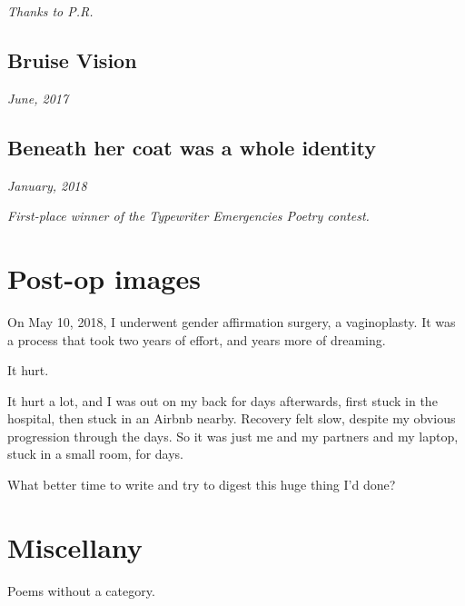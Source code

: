 \documentclass[10pt]{memoir}
\begin{document}
  \textit{Thanks to P.R.}
  \newpage


  \section{Bruise Vision}

  \hfill\textit{June, 2017}

  
  \newpage


  \section{Beneath her coat was a whole identity}

  \hfill\textit{January, 2018}

  

  \textit{First-place winner of the Typewriter Emergencies Poetry contest.}
  \newpage


  \chapter{Post-op images}

  On May 10, 2018, I underwent gender affirmation surgery, a vaginoplasty. It was a process that took two years of effort, and years more of dreaming.

  It hurt.

  It hurt a lot, and I was out on my back for days afterwards, first stuck in the hospital, then stuck in an Airbnb nearby. Recovery felt slow, despite my obvious progression through the days. So it was just me and my partners and my laptop, stuck in a small room, for days.

  What better time to write and try to digest this huge thing I'd done?
  \thispagestyle{empty}
  \newpage

  


  \chapter{Miscellany}

  Poems without a category.
  \thispagestyle{empty}
  \newpage

\end{document}
